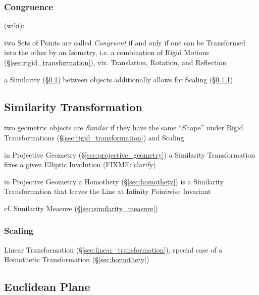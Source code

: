 \subsubsection{Congruence}\label{sec:congruence}

(wiki):

two Sets of Points are called \emph{Congruent} if and only if one can be
Transformed into the other by an Isometry, i.e. a combination of Rigid Motions
(\S\ref{sec:rigid_transformation}), viz. Translation, Rotation, and Reflection

\fist a Similarity (\S\ref{sec:similarity_transformation}) between objects
additionally allows for Scaling (\S\ref{sec:scaling})



\subsection{Similarity Transformation}\label{sec:similarity_transformation}

two geometric objects are \emph{Similar} if they have the same ``Shape'' under
Rigid Transformations (\S\ref{sec:rigid_transformation}) and Scaling

in Projective Geometry (\S\ref{sec:projective_geometry}) a Similarity
Transformation fixes a given Elliptic Involution (FIXME: clarify)

in Projective Geometry a Homothety (\S\ref{sec:homothety}) is a Similarity
Transformation that leaves the Line at Infinity Pointwise Invariant

\fist cf. Similarity Measure (\S\ref{sec:similarity_measure})



\subsubsection{Scaling}\label{sec:scaling}

Linear Transformation (\S\ref{sec:linear_transformation}), special case of a
Homothetic Transformation (\S\ref{sec:homothety})



\subsection{Euclidean Plane}\label{sec:euclidean_plane}

